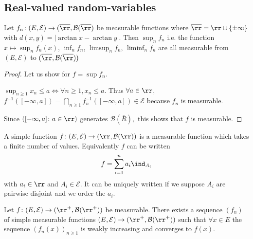 \documentclass[../main.tex]{subfiles}
\begin{document}
 \subsection{Real-valued random-variables}

  \begin{proposition}
      Let $f_n \colon (E, \mathcal{E}) \to (\overline{\rr},
      \mathcal{B}(\overline{\rr})$ be measurable functions where
      $\overline{\rr} = \rr \cup \{ \pm \infty \} $ with $d(x,y) =
      |\arctan x - \arctan y|$. Then $\sup_{n} f_n$ i.e. the function
      $x \mapsto \sup_n f_n(x)$, $\inf_n f_n$, $\limsup_{n} f_n$,
      $\liminf_n f_n$ are all measurable from $(E, \mathcal{E})$ to
      $(\overline{\rr}, \mathcal{B}(\overline{\rr})) $
  \end{proposition}

  \begin{proof}
      Let us show for $f = \sup f_n$. 
      \vspace{0.5em}

      $\sup_{n \geq 1} x_n \leq a \iff \forall n \geq 1, x_n \leq a$.
      Thus $\forall a \in \rr$, $f^{-1}([-\infty, a]) = \bigcap_{n
      \geq 1} f_n^{-1}([-\infty, a]) \in \mathcal{E}$ because $f_n$ is
      measurable.
      \vspace{0.5em}

      Since $([-\infty, a] \colon a \in \rr)$ generates
      $\mathcal{B}(\overline{R}),$ this shows that $f$ is measurable.
  \end{proof}
  \begin{definition}
    A simple function $f\colon (E, \mathcal{E}) \to (\rr,
    \mathcal{B}(\rr))$ is a measurable function which takes a finite
    number of values. Equivalently $f$ can be written 
    \[
    f = \sum_{i = 1}^n a_i \ind_{A_i}
    \]
    with $a_i \in \rr$ and $A_i \in \mathcal{E}$. It can be uniquely
    written if we suppose $A_i$ are pairwise disjoint and we order the
    $a_i$.
  \end{definition}

  \begin{theorem}
    Let $f\colon (E, \mathcal{E}) \to (\rr^+, \mathcal{B}(\rr^+))$ be
    measurable. There exists a sequence $(f_n)$ of simple measurable
    functions $(E, \mathcal{E}) \to (\rr^+, \mathcal{B}(\rr^+))$
    such that
    $\forall x \in E$ the sequence $(f_n(x))_{n \geq 1}$ is weakly
    increasing and converges to $f(x)$.
  \end{theorem}
\end{document}
